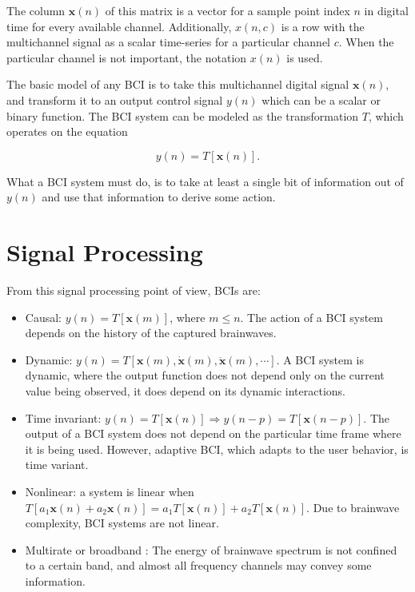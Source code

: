 The column $\mathbf{x}(n)$ of this matrix is a vector for a sample point index $n$ in digital time for every available channel.  Additionally, $x(n,c)$  is a row with the multichannel signal as a scalar time-series for a particular channel $c$.  When the particular channel is not important, the notation $x(n)$ is used.

The basic model of any BCI is to take this multichannel digital signal $\mathbf{x}(n)$, and transform it to an output control signal $y(n)$ which can be a scalar or binary function.  The BCI system can be modeled as the transformation $T$, which operates on the equation

\begin{equation}
y(n) = T\left[\mathbf{x}(n)\right].
\label{eq:bcimodel}
\end{equation}

What a BCI system must do, is to take at least a single bit of information out of $y(n)$ and use that information to derive some action. 

\section{Signal Processing}

From this signal processing point of view, BCIs are:

\begin{itemize}
\item Causal:  $ y(n) = T\left[  \mathbf{x}(m) \right] $, where $ m \leq n $.  The action of a BCI system depends on the history of the captured brainwaves.
\item Dynamic: $ y(n) = T\left[ \mathbf{x}(m),  \mathbf{\dot{x}}(m),\mathbf{\ddot{x}}(m), \cdots \right] $.  A BCI system is dynamic, where the output function does not depend only on the current value being observed, it does depend on its dynamic interactions.
\item Time invariant: $ y(n) = T\left[ \mathbf{x}(n) \right] \Rightarrow y(n-p) = T\left[ \mathbf{x}(n-p) \right] $.  The output of a BCI system does not depend on the particular time frame where it is being used.  However, adaptive BCI, which adapts to the user behavior, is time variant.
\item Nonlinear: a system is linear when $T\left[ a_1 \mathbf{x}(n) + a_2 \mathbf{x}(n) \right]  = a_1 T \left[ \mathbf{x}(n) \right] + a_2 T \left[ \mathbf{x}(n) \right] $. Due to brainwave complexity, BCI systems are not linear.
\item Multirate or broadband \cite{Miller2010}:  The energy of brainwave spectrum is not confined to a certain band, and almost all frequency channels may convey some information.
\end{itemize}

